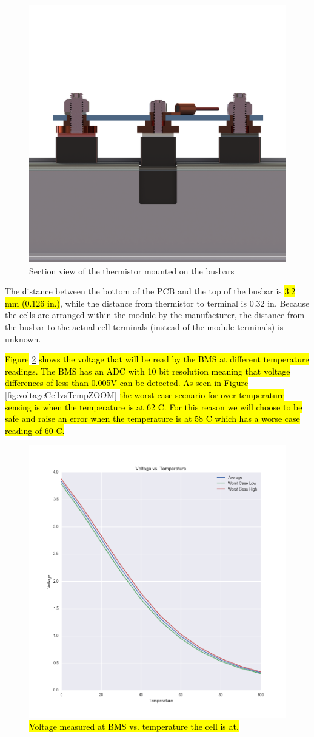 \documentclass{article}
\DeclareRobustCommand{\hlr}[1]{{\sethlcolor{red}\hl{#1}}}
\begin{document}
            \begin{figure}[H]
                \centering
                \includegraphics[width = 0.5 \textwidth]{busbarstack}
                \caption{Section view of the thermistor mounted on the busbars}
                \label{busbarstack}
            \end{figure}

            The distance between the bottom of the PCB and the top of the busbar is \hlr{3.2 mm (0.126 in.)}, while the distance from thermistor to terminal is 0.32 in. Because the cells are arranged within the module by the manufacturer, the distance from the busbar to the actual cell terminals (instead of the module terminals) is unknown.

            \hlr{Figure} \ref{fig:voltageCellvsTemp} \hlr{shows the voltage that will be read by the BMS at different temperature readings. The BMS has an ADC with 10 bit resolution meaning that voltage differences of less than 0.005V can be detected. As seen in Figure }\ref{fig:voltageCellvsTempZOOM} \hlr{the worst case scenario for over-temperature sensing is when the temperature is at 62 \degree C. For this reason we will choose to be safe and raise an error when the temperature is at 58 \degree C which has a worse case reading of 60 \degree C.}

                \begin{figure}[H]
                \centering
                \includegraphics[width =0.6 \textwidth]{VoltageVSTemp.png}
                \caption{\hlr{Voltage measured at BMS vs. temperature the cell is at.}}
                \label{fig:voltageCellvsTemp}
                \end{figure}
\end{document}
